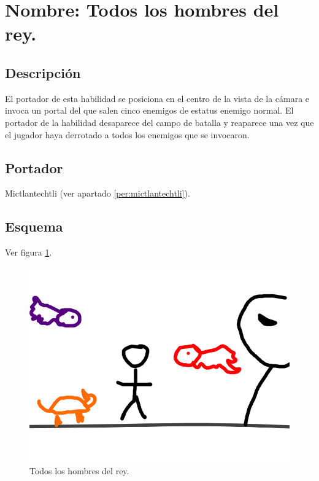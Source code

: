 \section{Nombre: Todos los hombres del rey.}\label{hab.TodoRey}
\subsection{Descripción}
El portador de esta habilidad se posiciona en el centro de la vista de la cámara e invoca un portal del que salen cinco enemigos de estatus enemigo normal. El portador de la habilidad desaparece del campo de batalla y reaparece una vez que el jugador haya derrotado a todos los enemigos que se invocaron.  
\subsection{Portador}
Mictlantechtli (ver apartado \ref{per:mictlantechtli}).	
\subsection{Esquema}
			Ver figura \ref{fig:rey}.
			\begin{figure}
				\centering
				\includegraphics[height=0.2 \textheight]{Imagenes/rey}
				\caption{Todos los hombres del rey.}
				\label{fig:rey}
			\end{figure}
